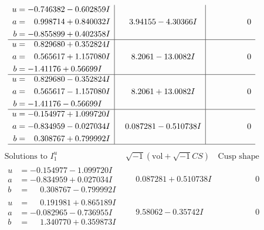 \documentclass[1p]{elsarticle_modified}
\theoremstyle{definition}
\newcommand{\I}{\sqrt{-1}}
\begin{document}
$$\begin{array}{c|c|c}
\begin{aligned}
u &= -0.746382 - 0.602859 I \\
a &= \phantom{-}0.998714 + 0.840032 I \\
b &= -0.855899 + 0.402358 I\end{aligned}
 & \phantom{-}3.94155 - 4.30366 I & \phantom{-0.000000 } 0 \\ \hline\begin{aligned}
u &= \phantom{-}0.829680 + 0.352824 I \\
a &= \phantom{-}0.565617 + 1.157080 I \\
b &= -1.41176 + 0.56699 I\end{aligned}
 & \phantom{-}8.2061 - 13.0082 I & \phantom{-0.000000 } 0 \\ \hline\begin{aligned}
u &= \phantom{-}0.829680 - 0.352824 I \\
a &= \phantom{-}0.565617 - 1.157080 I \\
b &= -1.41176 - 0.56699 I\end{aligned}
 & \phantom{-}8.2061 + 13.0082 I & \phantom{-0.000000 } 0 \\ \hline\begin{aligned}
u &= -0.154977 + 1.099720 I \\
a &= -0.834959 - 0.027034 I \\
b &= \phantom{-}0.308767 + 0.799992 I\end{aligned}
 & \phantom{-}0.087281 - 0.510738 I & \phantom{-0.000000 } 0\\
 \hline 
 \end{array}$$\newpage$$\begin{array}{c|c|c}  
\text{Solutions to }I^u_{1}& \I (\text{vol} + \sqrt{-1}CS) & \text{Cusp shape}\\
 \hline 
\begin{aligned}
u &= -0.154977 - 1.099720 I \\
a &= -0.834959 + 0.027034 I \\
b &= \phantom{-}0.308767 - 0.799992 I\end{aligned}
 & \phantom{-}0.087281 + 0.510738 I & \phantom{-0.000000 } 0 \\ \hline\begin{aligned}
u &= \phantom{-}0.191981 + 0.865189 I \\
a &= -0.082965 - 0.736955 I \\
b &= \phantom{-}1.340770 + 0.359873 I\end{aligned}
 & \phantom{-}9.58062 - 0.35742 I & \phantom{-0.000000 } 0 \\ \hline\begin{aligned}

\end{aligned}
\end{array}$$
\end{document}
